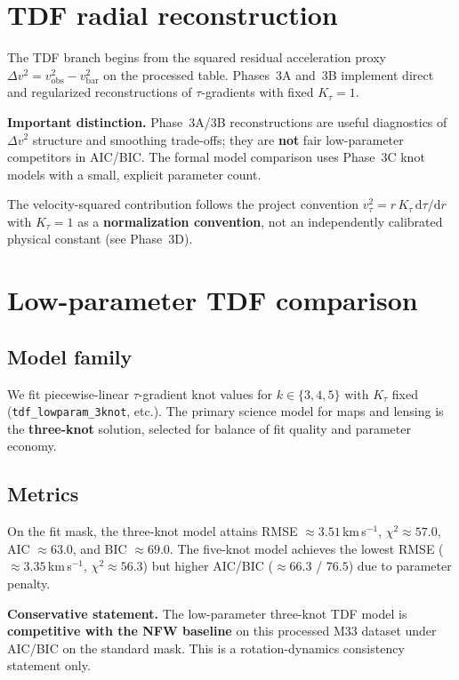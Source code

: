 \documentclass[11pt,a4paper]{article}
\begin{document}
\section{TDF radial reconstruction}
\label{sec:tdf-radial}

The TDF branch begins from the squared residual acceleration proxy $\Delta v^2 = v_{\mathrm{obs}}^2 - v_{\mathrm{bar}}^2$ on the processed table.
Phases~3A and~3B implement direct and regularized reconstructions of $\tau$-gradients with fixed $K_\tau=1$.

\textbf{Important distinction.} Phase~3A/3B reconstructions are useful diagnostics of $\Delta v^2$ structure and smoothing trade-offs; they are \textbf{not} fair low-parameter competitors in AIC/BIC.
The formal model comparison uses Phase~3C knot models with a small, explicit parameter count.

The velocity-squared contribution follows the project convention $v_\tau^2 = r\,K_\tau\,\mathrm{d}\tau/\mathrm{d}r$ with $K_\tau=1$ as a \textbf{normalization convention}, not an independently calibrated physical constant (see Phase~3D).

\section{Low-parameter TDF comparison}
\label{sec:tdf-compare}

\subsection{Model family}

We fit piecewise-linear $\tau$-gradient knot values for $k\in\{3,4,5\}$ with $K_\tau$ fixed (\texttt{tdf\_lowparam\_3knot}, etc.).
The primary science model for maps and lensing is the \textbf{three-knot} solution, selected for balance of fit quality and parameter economy.

\subsection{Metrics}

On the fit mask, the three-knot model attains RMSE $\approx 3.51$\,km\,s$^{-1}$, $\chi^2 \approx 57.0$, AIC $\approx 63.0$, and BIC $\approx 69.0$.
The five-knot model achieves the lowest RMSE ($\approx 3.35$\,km\,s$^{-1}$, $\chi^2 \approx 56.3$) but higher AIC/BIC ($\approx 66.3$ / $76.5$) due to parameter penalty.

\textbf{Conservative statement.} The low-parameter three-knot TDF model is \textbf{competitive with the NFW baseline} on this processed M33 dataset under AIC/BIC on the standard mask.
This is a rotation-dynamics consistency statement only.
\end{document}

